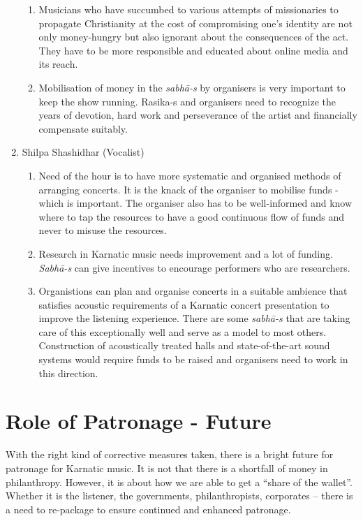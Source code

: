 \begin{enumerate}
\begin{enumerate}
 \item Musicians who have succumbed to various attempts of missionaries to propagate Christianity at the cost of compromising one’s identity are not only money-hungry but also ignorant about the consequences of the act. They have to be more responsible and educated about online media and its reach.

 \item Mobilisation of money in the \textit{sabhā-s} by organisers is very important to keep the show running. Rasika-s and organisers need to recognize the years of devotion, hard work and perseverance of the artist and financially compensate suitably.
\end{enumerate}

 \item Shilpa Shashidhar (Vocalist)
 
\begin{enumerate}
\itemsep=0pt
\item Need of the hour is to have more systematic and organised methods of arranging concerts. It is the knack of the organiser to mobilise funds - which is important. The organiser also has to be well-informed and know where to tap the resources to have a good continuous flow of funds and never to misuse the resources.

 \item Research in Karnatic music needs improvement and a lot of funding. \textit{Sabhā-s} can give incentives to encourage performers who are researchers.

 \item Organistions can plan and organise concerts in a suitable ambience that satisfies acoustic requirements of a Karnatic concert presentation to improve the listening experience. There are some \textit{sabhā-s} that are taking care of this exceptionally well and serve as a model to most others. Construction of acoustically treated halls and state-of-the-art sound systems would require funds to be raised and organisers need to work in this direction.
\end{enumerate}

\end{enumerate}


\section*{Role of Patronage - Future}

With the right kind of corrective measures taken, there is a bright future for patronage for Karnatic music. It is not that there is a shortfall of money in philanthropy. However, it is about how we are able to get a “share of the wallet”. Whether it is the listener, the governments, philanthropists, corporates – there is a need to re-package to ensure continued and enhanced patronage.

